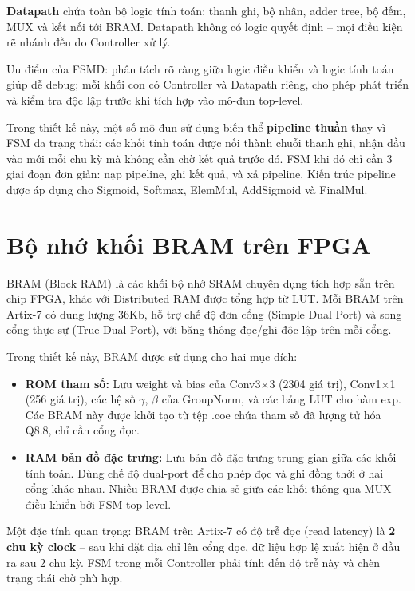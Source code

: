 \documentclass{uetgraduation}
\begin{document}
\textbf{Datapath} chứa toàn bộ logic tính toán: thanh ghi, bộ nhân, adder tree, bộ
đếm, MUX và kết nối tới BRAM. Datapath không có logic quyết định -- mọi điều kiện
rẽ nhánh đều do Controller xử lý.

Ưu điểm của FSMD: phân tách rõ ràng giữa logic điều khiển và logic tính toán giúp
dễ debug; mỗi khối con có Controller và Datapath riêng, cho phép phát triển và kiểm
tra độc lập trước khi tích hợp vào mô-đun top-level.

Trong thiết kế này, một số mô-đun sử dụng biến thể \textbf{pipeline thuần} thay vì
FSM đa trạng thái: các khối tính toán được nối thành chuỗi thanh ghi, nhận đầu vào
mới mỗi chu kỳ mà không cần chờ kết quả trước đó. FSM khi đó chỉ cần 3 giai đoạn
đơn giản: nạp pipeline, ghi kết quả, và xả pipeline. Kiến trúc
pipeline được áp dụng cho Sigmoid, Softmax, ElemMul, AddSigmoid và FinalMul.

\section{Bộ nhớ khối BRAM trên FPGA}
BRAM (Block RAM) là các khối bộ nhớ SRAM chuyên dụng tích hợp sẵn trên chip FPGA,
khác với Distributed RAM được tổng hợp từ LUT. Mỗi BRAM trên Artix-7 có dung lượng
36Kb, hỗ trợ chế độ đơn cổng (Simple Dual Port) và song cổng thực sự (True Dual
Port), với băng thông đọc/ghi độc lập trên mỗi cổng.

Trong thiết kế này, BRAM được sử dụng cho hai mục đích:
\begin{itemize}
    \item \textbf{ROM tham số:} Lưu weight và bias của Conv3$\times$3 (2304 giá trị),
    Conv1$\times$1 (256 giá trị), các hệ số $\gamma$, $\beta$ của GroupNorm, và các
    bảng LUT cho hàm exp. Các BRAM này được khởi tạo từ tệp .coe chứa tham số đã
    lượng tử hóa Q8.8, chỉ cần cổng đọc.
    \item \textbf{RAM bản đồ đặc trưng:} Lưu bản đồ đặc trưng trung gian giữa các khối tính
    toán. Dùng chế độ dual-port để cho phép đọc và ghi đồng thời ở hai cổng khác
    nhau. Nhiều BRAM được chia sẻ giữa các khối thông qua MUX điều khiển bởi FSM
    top-level.
\end{itemize}

Một đặc tính quan trọng: BRAM trên Artix-7 có độ trễ đọc (read latency) là
\textbf{2 chu kỳ clock} -- sau khi đặt địa chỉ lên cổng đọc, dữ liệu hợp lệ
xuất hiện ở đầu ra sau 2 chu kỳ. FSM trong mỗi Controller phải tính đến độ trễ
này và chèn trạng thái chờ phù hợp.
\end{document}
